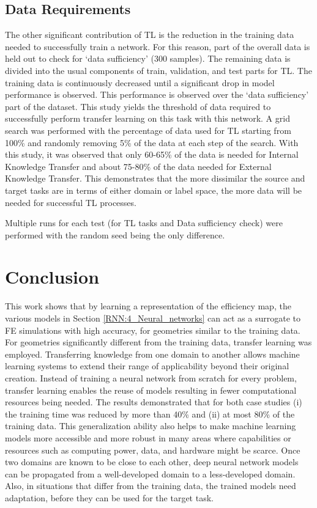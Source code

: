 \subsection{Data Requirements}\label{RNN:9_Results_TL_DataRequirements}

The other significant contribution of TL is the reduction in the training data needed to successfully train a network. For this reason, part of the overall data is held out to check for ‘data sufficiency’ (300 samples). The remaining data is divided into the usual components of train, validation, and test parts for TL. The training data is continuously decreased until a significant drop in model performance is observed. This performance is observed over the ‘data sufficiency’ part of the dataset. This study yields the threshold of data required to successfully perform transfer learning on this task with this network. A grid search was performed with the percentage of data used for TL starting from 100\% and randomly removing 5\% of the data at each step of the search. With this study, it was observed that only 60-65\% of the data is needed for Internal Knowledge Transfer and about 75-80\% of the data needed for External Knowledge Transfer. This demonstrates that the more dissimilar the source and target tasks are in terms of either domain or label space, the more data will be needed for successful TL processes.

Multiple runs for each test (for TL tasks and Data sufficiency check) were performed with the random seed being the only difference.

\section{Conclusion}\label{RNN:10_Conclusion_TL}

This work shows that by learning a representation of the efficiency map, the various models in Section \ref{RNN:4_Neural_networks} can act as a surrogate to FE simulations with high accuracy, for geometries similar to the training data. For geometries significantly different from the training data, transfer learning was employed.
Transferring knowledge from one domain to another allows machine learning systems to extend their range of applicability beyond their original creation. Instead of training a neural network from scratch for every problem, transfer learning enables the reuse of models resulting in fewer computational resources being needed. The results demonstrated that for both case studies (i) the training time was reduced by more than 40\% and (ii) at most 80\% of the training data. This generalization ability also helps to make machine learning models more accessible and more robust in many areas where capabilities or resources such as computing power, data, and hardware might be scarce. Once two domains are known to be close to each other, deep neural network models can be propagated from a well-developed domain to a less-developed domain. Also, in situations that differ from the training data, the trained models need adaptation, before they can be used for the target task. 

